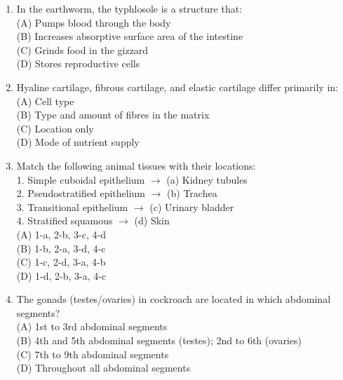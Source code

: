 \documentclass{article}
\begin{document}
\begin{enumerate}[label=Q\arabic*.]
\item In the earthworm, the typhlosole is a structure that:
\\(A) Pumps blood through the body
\\(B) Increases absorptive surface area of the intestine
\\(C) Grinds food in the gizzard
\\(D) Stores reproductive cells

\item Hyaline cartilage, fibrous cartilage, and elastic cartilage differ primarily in:
\\(A) Cell type
\\(B) Type and amount of fibres in the matrix
\\(C) Location only
\\(D) Mode of nutrient supply

\item Match the following animal tissues with their locations:\\
1. Simple cuboidal epithelium $\rightarrow$ (a) Kidney tubules\\
2. Pseudostratified epithelium $\rightarrow$ (b) Trachea\\
3. Transitional epithelium $\rightarrow$ (c) Urinary bladder\\
4. Stratified squamous $\rightarrow$ (d) Skin
\\(A) 1-a, 2-b, 3-c, 4-d
\\(B) 1-b, 2-a, 3-d, 4-c
\\(C) 1-c, 2-d, 3-a, 4-b
\\(D) 1-d, 2-b, 3-a, 4-c

\item The gonads (testes/ovaries) in cockroach are located in which abdominal segments?
\\(A) 1st to 3rd abdominal segments
\\(B) 4th and 5th abdominal segments (testes); 2nd to 6th (ovaries)
\\(C) 7th to 9th abdominal segments
\\(D) Throughout all abdominal segments

\end{enumerate}
\end{document}

